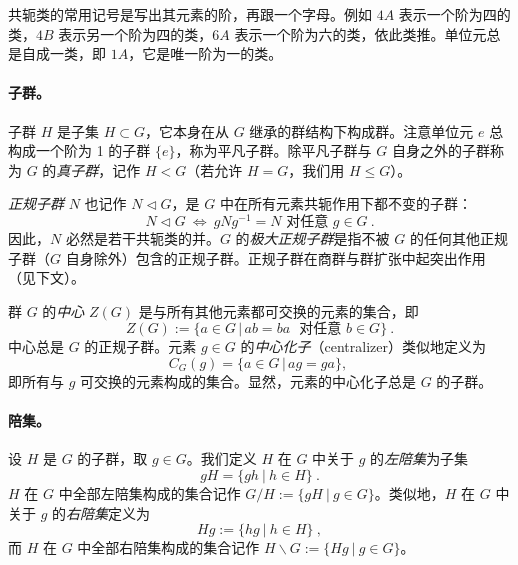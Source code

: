 \documentclass[11pt,a4paper,fontset=windows]{ctexart}
\numberwithin{equation}{section}
\newcommand{\Co}{\operatorname{\textsl{Co}}}      %
\newcommand{\myparagraph}[1]{\paragraph{#1}\mbox\\}
\newcommand{\Cl}{\text{Cl}}
\begin{document}

共轭类的常用记号是写出其元素的阶，再跟一个字母。例如 $4A$ 表示一个阶为四的类，$4B$ 表示另一个阶为四的类，$6A$ 表示一个阶为六的类，依此类推。单位元总是自成一类，即 $1A$，它是唯一阶为一的类。

\myparagraph{子群。}
子群 $H$ 是子集 $H\subset G$，它本身在从 $G$ 继承的群结构下构成群。注意单位元 $e$ 总构成一个阶为 1 的子群 $\lbrace e\rbrace$，称为平凡子群。除平凡子群与 $G$ 自身之外的子群称为 $G$ 的\emph{真子群}，记作 $H<G$（若允许 $H=G$，我们用 $H\leq G$）。

\emph{正规子群} $N$ 也记作 $N\triangleleft G$，是 $G$ 中在所有元素共轭作用下都不变的子群：
\begin{equation}
N\triangleleft G~\Leftrightarrow~gNg^{-1}=N\text{ 对任意 }g\in G~.
\end{equation}
因此，$N$ 必然是若干共轭类的并。$G$ 的\emph{极大正规子群}是指不被 $G$ 的任何其他正规子群（$G$ 自身除外）包含的正规子群。正规子群在商群与群扩张中起突出作用（见下文）。

群 $G$ 的\emph{中心} $Z(G)$ 是与所有其他元素都可交换的元素的集合，即
\begin{equation}
Z(G):=\lbrace a\in G\,\lvert\, ab=ba\text{~~对任意 } b\in G\rbrace~.
\end{equation}
中心总是 $G$ 的正规子群。元素 $g\in G$ 的\emph{中心化子}（centralizer）类似地定义为
\begin{equation}
C_G(g)=\lbrace a\in G\,\lvert\, ag=ga\rbrace,~
\end{equation}
即所有与 $g$ 可交换的元素构成的集合。显然，元素的中心化子总是 $G$ 的子群。

\myparagraph{陪集。}
设 $H$ 是 $G$ 的子群，取 $g\in G$。我们定义 $H$ 在 $G$ 中关于 $g$ 的\emph{左陪集}为子集
\begin{equation}
gH=\lbrace gh~|~h\in H\rbrace~.
\end{equation}
$H$ 在 $G$ 中全部左陪集构成的集合记作 $G/H:=\lbrace gH~|~g\in G\rbrace$。类似地，$H$ 在 $G$ 中关于 $g$ 的\emph{右陪集}定义为
\begin{equation}
Hg:=\lbrace hg~|~h\in H\rbrace~,
\end{equation}
而 $H$ 在 $G$ 中全部右陪集构成的集合记作 $H\backslash G:=\lbrace Hg~|~g\in G\rbrace$。
\end{document}
